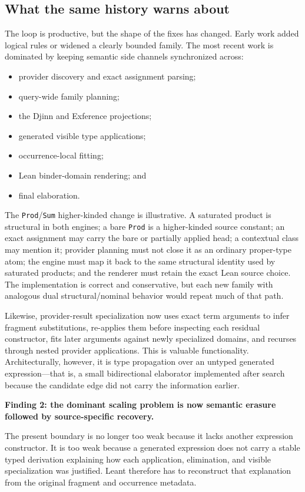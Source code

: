 \documentclass[11pt]{article}
\newcommand{\code}[1]{\texttt{#1}}
\newcommand{\Djinn}{Djinn}
\newcommand{\Exference}{Exference}
\newenvironment{finding}[1]
{\par\medskip\noindent\colorbox{AccentLight}{\parbox{\dimexpr\linewidth-2\fboxsep\relax}{\sffamily\bfseries #1}}\par\smallskip}
{\par\medskip}
\begin{document}
\subsection{What the same history warns about}

The loop is productive, but the shape of the fixes has changed.  Early work
added logical rules or widened a clearly bounded family.  The most recent work
is dominated by keeping semantic side channels synchronized across:

\begin{itemize}
  \item provider discovery and exact assignment parsing;
  \item query-wide family planning;
  \item the \Djinn{} and \Exference{} projections;
  \item generated visible type applications;
  \item occurrence-local fitting;
  \item Lean binder-domain rendering; and
  \item final elaboration.
\end{itemize}

The \code{Prod}/\code{Sum} higher-kinded change is illustrative.  A saturated
product is structural in both engines; a bare \code{Prod} is a higher-kinded
source constant; an exact assignment may carry the bare or partially applied
head; a contextual class may mention it; provider planning must not close it as
an ordinary proper-type atom; the engine must map it back to the same structural
identity used by saturated products; and the renderer must retain the exact
Lean source choice.  The implementation is correct and conservative, but each
new family with analogous dual structural/nominal behavior would repeat much
of that path.

Likewise, provider-result specialization now uses exact term arguments to infer
fragment substitutions, re-applies them before inspecting each residual
constructor, fits later arguments against newly specialized domains, and
recurses through nested provider applications.  This is valuable functionality.
Architecturally, however, it is type propagation over an untyped generated
expression---that is, a small bidirectional elaborator implemented after
search because the candidate edge did not carry the information earlier.

\begin{finding}{Finding 2: the dominant scaling problem is now semantic erasure followed by source-specific recovery.}
The present boundary is no longer too weak because it lacks another expression
constructor.  It is too weak because a generated expression does not carry a
stable typed derivation explaining how each application, elimination, and
visible specialization was justified.  Leant therefore has to reconstruct that
explanation from the original fragment and occurrence metadata.
\end{finding}
\end{document}

